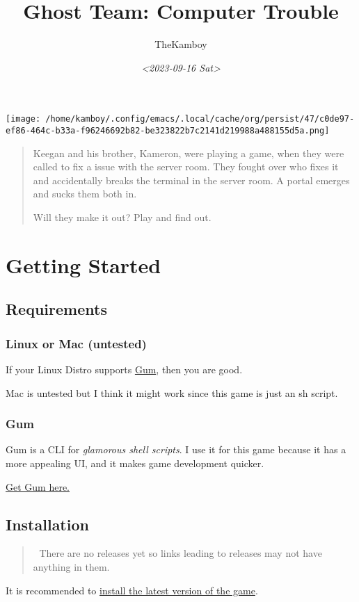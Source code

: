 \documentclass[11pt]{article}
\author{TheKamboy}
\date{\textit{<2023-09-16 Sat>}}
\title{Ghost Team: Computer Trouble}
\begin{document}
\maketitle
\begin{center}
\texttt{[image: /home/kamboy/.config/emacs/.local/cache/org/persist/47/c0de97-ef86-464c-b33a-f96246692b82-be323822b7c2141d219988a488155d5a.png]}
\end{center}

\begin{quote}
Keegan and his brother, Kameron, were playing a game, when they were called to fix a issue with the server room.
They fought over who fixes it and accidentally breaks the terminal in the server room.
A portal emerges and sucks them both in.

Will they make it out? Play and find out.
\end{quote}
\section{Getting Started}
\label{sec:org59d15f0}
\subsection{Requirements}
\label{sec:org22a3ab2}
\subsubsection{Linux or Mac (untested)}
\label{sec:orgf8d6a19}
If your Linux Distro supports \hyperref[sec:org467268d]{Gum}, then you are good.

Mac is untested but I think it might work since this game is just an sh script.
\subsubsection{Gum}
\label{sec:org467268d}
Gum is a CLI for \emph{glamorous shell scripts}. I use it for this game because it has a more appealing UI, and it makes game development quicker.

\href{https://github.com/charmbracelet/gum}{Get Gum here.}
\subsection{Installation}
\label{sec:orgeaaf80e}
\begin{quote}
🔨 There are no releases yet so links leading to releases may not have anything in them.
\end{quote}
It is recommended to \href{https://github.com/TheKamboy/gt-computer-trouble/releases/latest}{install the latest version of the game}.
\end{document}
